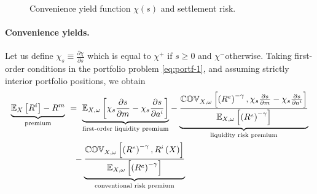 \documentclass[12pt,american,english,notitlepage]{article}
\begin{document}
\begin{figure}[h]
\caption{Convenience yield function $\chi(s)$ and settlement risk.  }
\label{fig:liquidity_yields}
\end{figure}

\paragraph*{Convenience yields.}

Let us define $\chi_{s}\equiv\frac{\partial\chi}{\partial s}$ which
is equal to $\chi^{+}$ if $s\ge0$ and $\chi^{-}$otherwise. Taking
first-order conditions in the portfolio problem \eqref{eq:portf-1}, and assuming strictly interior portfolio positions, we obtain
\begin{align}
\underset{\text{premium}}{\underbrace{\mathbb{E}_{X}\left[R^{i}\right]-R^{m}}}
& \ = \ 
\underset{\text{first-order liquidity premium}}{
\underbrace{
\mathbb{E}_{X,\omega}\left[\chi_{s}\frac{\partial s}{\partial m}
-\chi_{s}\frac{\partial s}{\partial a^{i}}\right]
}
}
-
\underset{\text{liquidity risk premium}}{
\underbrace{
\frac{
\mathbb{COV}_{X,\omega}\left[
\left(R^{e}\right)^{-\gamma},
\chi_{s}\frac{\partial s}{\partial m}
-\chi_{s}\frac{\partial s}{\partial a^{i}}
\right]
}{
\mathbb{E}_{X,\omega}\left[\left(R^{e}\right)^{-\gamma}\right]
}
}
} \notag \\
&\quad 
-
\underset{\text{conventional risk premium}}{
\underbrace{
\frac{
\mathbb{COV}_{X,\omega}\left[
\left(R^{e}\right)^{-\gamma},
R^{i}\left(X\right)
\right]
}{
\mathbb{E}_{X,\omega}\left[\left(R^{e}\right)^{-\gamma}\right]
}
}
} 
\label{eq:liquidity.premiumcov} 
\end{align}
\end{document}
